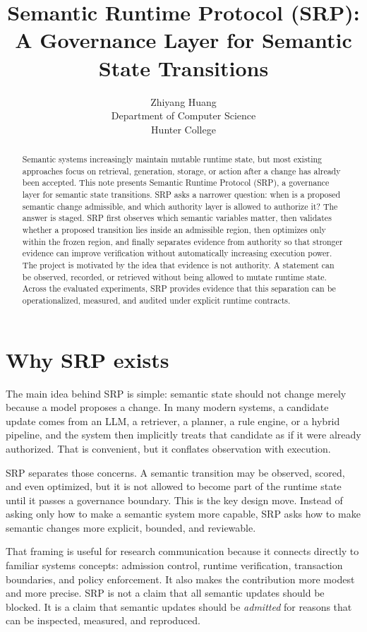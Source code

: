 \documentclass[10pt]{article}
\title{Semantic Runtime Protocol (SRP): A Governance Layer for Semantic State Transitions}
\author{Zhiyang Huang\\Department of Computer Science\\Hunter College}
\date{}
\begin{document}
\setlength{\emergencystretch}{2em}
\maketitle

\begin{abstract}
Semantic systems increasingly maintain mutable runtime state, but most existing approaches focus on retrieval, generation, storage, or action after a change has already been accepted. This note presents Semantic Runtime Protocol (SRP), a governance layer for semantic state transitions. SRP asks a narrower question: when is a proposed semantic change admissible, and which authority layer is allowed to authorize it? The answer is staged. SRP first observes which semantic variables matter, then validates whether a proposed transition lies inside an admissible region, then optimizes only within the frozen region, and finally separates evidence from authority so that stronger evidence can improve verification without automatically increasing execution power. The project is motivated by the idea that evidence is not authority. A statement can be observed, recorded, or retrieved without being allowed to mutate runtime state. Across the evaluated experiments, SRP provides evidence that this separation can be operationalized, measured, and audited under explicit runtime contracts.
\end{abstract}

\section{Why SRP exists}
The main idea behind SRP is simple: semantic state should not change merely because a model proposes a change. In many modern systems, a candidate update comes from an LLM, a retriever, a planner, a rule engine, or a hybrid pipeline, and the system then implicitly treats that candidate as if it were already authorized. That is convenient, but it conflates observation with execution.

SRP separates those concerns. A semantic transition may be observed, scored, and even optimized, but it is not allowed to become part of the runtime state until it passes a governance boundary. This is the key design move. Instead of asking only how to make a semantic system more capable, SRP asks how to make semantic changes more explicit, bounded, and reviewable.

That framing is useful for research communication because it connects directly to familiar systems concepts: admission control, runtime verification, transaction boundaries, and policy enforcement. It also makes the contribution more modest and more precise. SRP is not a claim that all semantic updates should be blocked. It is a claim that semantic updates should be \emph{admitted} for reasons that can be inspected, measured, and reproduced.
\end{document}
